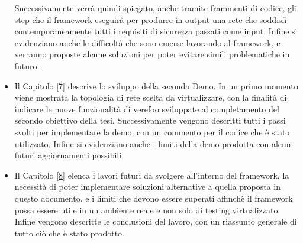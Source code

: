 \begin{itemize}
          Successivamente verrà quindi spiegato, anche tramite frammenti di codice, gli step
          che il framework eseguirà per produrre in output una rete che soddisfi contemporaneamente tutti i requisiti di sicurezza passati come input.  
          Infine si evidenziano anche le difficoltà che sono emerse lavorando al framework, e verranno proposte alcune soluzioni per poter evitare simili problematiche in futuro.
    \item Il Capitolo \hyperref[ch:DemoB]{[7]} descrive lo sviluppo della seconda Demo. In un primo momento viene mostrata la topologia
        di rete scelta da virtualizzare, con la finalità di indicare le nuove funzionalità di verefoo sviluppate al completamento del secondo obiettivo della tesi. Successivamente vengono descritti tutti i passi svolti per implementare la demo, con un commento per il codice che è stato utilizzato. Infine
        si evidenziano anche i limiti della demo prodotta con alcuni  futuri aggiornamenti possibili.
    \item Il Capitolo \hyperref[ch:conclusions]{[8]} elenca i lavori futuri da svolgere all'interno del framework, la necessità di poter implementare soluzioni
          alternative a quella proposta in questo documento, e i limiti che devono essere superati affinchè il framework possa essere utile in un ambiente reale e non
          solo di testing virtualizzato. Infine vengono descritte le conclusioni del lavoro, con un riassunto generale di tutto ciò che è stato prodotto.
\end{itemize}